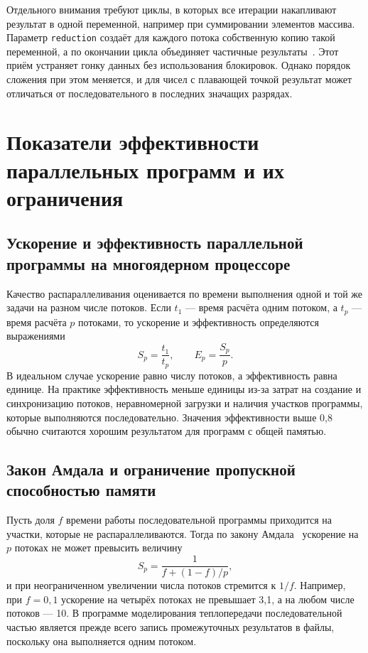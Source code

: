 Отдельного внимания требуют циклы, в которых все итерации накапливают результат в одной переменной, например при суммировании элементов массива. Параметр \texttt{reduction} создаёт для каждого потока собственную копию такой переменной, а по окончании цикла объединяет частичные результаты~\cite{chandra2001parallel}. Этот приём устраняет гонку данных без использования блокировок. Однако порядок сложения при этом меняется, и для чисел с плавающей точкой результат может отличаться от последовательного в последних значащих разрядах.

\section{Показатели эффективности параллельных программ и их ограничения}

\subsection{Ускорение и эффективность параллельной программы на многоядерном процессоре}

Качество распараллеливания оценивается по времени выполнения одной и той же задачи на разном числе потоков. Если $t_1$ --- время расчёта одним потоком, а $t_p$ --- время расчёта $p$ потоками, то ускорение и эффективность определяются выражениями
\begin{equation}
    S_p = \frac{t_1}{t_p}, \qquad E_p = \frac{S_p}{p}.
    \label{eq:speedup}
\end{equation}
В идеальном случае ускорение равно числу потоков, а эффективность равна единице. На практике эффективность меньше единицы из-за затрат на создание и синхронизацию потоков, неравномерной загрузки и наличия участков программы, которые выполняются последовательно. Значения эффективности выше 0,8 обычно считаются хорошим результатом для программ с общей памятью.

\subsection{Закон Амдала и ограничение пропускной способностью памяти}

Пусть доля $f$ времени работы последовательной программы приходится на участки, которые не распараллеливаются. Тогда по закону Амдала~\cite{amdahl1967validity} ускорение на $p$ потоках не может превысить величину
\begin{equation}
    S_p = \frac{1}{f + (1 - f)/p},
    \label{eq:amdahl}
\end{equation}
и при неограниченном увеличении числа потоков стремится к $1/f$. Например, при $f = 0{,}1$ ускорение на четырёх потоках не превышает 3,1, а на любом числе потоков --- 10. В программе моделирования теплопередачи последовательной частью является прежде всего запись промежуточных результатов в файлы, поскольку она выполняется одним потоком.

